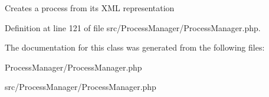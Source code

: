 Creates a process from its XML representation 

Definition at line 121 of file src/Process\-Manager/Process\-Manager.php.

The documentation for this class was generated from the following files:\begin{CompactItemize}
\item 
Process\-Manager/Process\-Manager.php\item 
src/Process\-Manager/Process\-Manager.php\end{CompactItemize}
